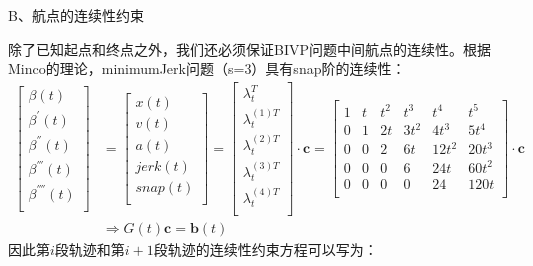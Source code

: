 \documentclass[master,academic]{ysuthesis} %
\begin{document}
			B、航点的连续性约束
			
			除了已知起点和终点之外，我们还必须保证BIVP问题中间航点的连续性。根据Minco的理论，minimumJerk问题（s=3）具有snap阶的连续性：
			\begin{equation}
				\begin{aligned}
					\left[ \begin{array}{c}
						\beta(t)\\
						\beta^{'}(t)\\
						\beta^{''}(t)\\
						\beta^{'''}(t)\\
						\beta^{''''}(t)\\
					\end{array} \right] &=\left[ \begin{array}{c}
						x(t)\\
						v(t)\\
						a(t)\\
						jerk(t)\\
						snap(t)\\
					\end{array} \right] =\left[ \begin{array}{c}
						\lambda_{t}^{T}\\
						\lambda_{t}^{( 1 ) T}\\
						\lambda_{t}^{( 2 ) T}\\
						\lambda_{t}^{( 3 ) T}\\
						\lambda_{t}^{( 4 ) T}\\
					\end{array} \right] \cdot \mathbf{c}=\left[ \begin{matrix}
						1&		t&		t^2&		t^3&		t^4&		t^5\\
						0&		1&		2t&		3t^2&		4t^3&		5t^4\\
						0&		0&		2&		6t&		12t^2&		20t^3\\
						0&		0&		0&		6&		24t&		60t^2\\
						0&		0&		0&		0&		24&		120t\\
					\end{matrix} \right] \cdot \mathbf{c}\\
					&\Longrightarrow G(t) \mathbf{c}=\mathbf{b}(t) 
				\end{aligned}
			\end{equation}
			因此第$i$段轨迹和第$i+1$段轨迹的连续性约束方程可以写为：
\end{document}
